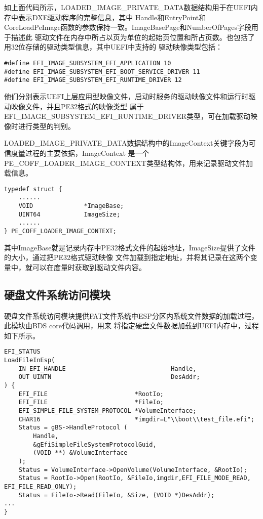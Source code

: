 如上面代码所示，LOADED\_IMAGE\_PRIVATE\_DATA数据结构用于在UEFI内存中表示DXE驱动程序的完整信息，其中
Handle和EntryPoint和CoreLoadPeImage函数的参数保持一致。ImageBasePage和NumberOfPages字段用于描述此
驱动文件在内存中所占以页为单位的起始页位置和所占页数。也包括了用32位存储的驱动类型信息，其中UEFI中支持的
驱动映像类型包括：

\begin{lstlisting}
#define EFI_IMAGE_SUBSYSTEM_EFI_APPLICATION 10
#define EFI_IMAGE_SUBSYSTEM_EFI_BOOT_SERVICE_DRIVER 11
#define EFI_IMAGE_SUBSYSTEM_EFI_RUNTIME_DRIVER 12
\end{lstlisting}

他们分别表示UEFI上层应用型映像文件，启动时服务的驱动映像文件和运行时驱动映像文件，并且PE32格式的映像类型
属于EFI\_IMAGE\_SUBSYSTEM\_EFI\_RUNTIME\_DRIVER类型，可在加载驱动映像时进行类型的判别。
\par LOADED\_IMAGE\_PRIVATE\_DATA数据结构中的ImageContext关键字段为可信度量过程的主要依据，ImageContext
是一个PE\_COFF\_LOADER\_IMAGE\_CONTEXT类型结构体，用来记录驱动文件加载信息。

\begin{lstlisting}
typedef struct {
    ......
    VOID              *ImageBase;
    UINT64            ImageSize;
    ......
} PE_COFF_LOADER_IMAGE_CONTEXT;
\end{lstlisting}

其中ImageBase就是记录内存中PE32格式文件的起始地址，ImageSize提供了文件的大小，通过把PE32格式驱动映像
文件加载到指定地址，并将其记录在这两个变量中，就可以在度量时获取到驱动文件内容。

\subsection{硬盘文件系统访问模块}
硬盘文件系统访问模块提供FAT文件系统中ESP分区内系统文件数据的加载过程，此模块由BDS core代码调用，用来
将指定硬盘文件数据加载到UEFI内存中，过程如下所示。

\begin{lstlisting}
EFI_STATUS
LoadFileInEsp(
    IN EFI_HANDLE                             Handle,
    OUT UINTN                                 DesAddr;
) {
    EFI_FILE                        *RootIo;
    EFI_FILE                        *FileIo;
    EFI_SIMPLE_FILE_SYSTEM_PROTOCOL *VolumeInterface;
    CHAR16                          *imgdir=L"\\boot\\test_file.efi";
    Status = gBS->HandleProtocol (
        Handle,
        &gEfiSimpleFileSystemProtocolGuid,
        (VOID **) &VolumeInterface
    );
    Status = VolumeInterface->OpenVolume(VolumeInterface, &RootIo);
    Status = RootIo->Open(RootIo, &FileIo,imgdir,EFI_FILE_MODE_READ, EFI_FILE_READ_ONLY);
    Status = FileIo->Read(FileIo, &Size, (VOID *)DesAddr);
...
}
\end{lstlisting}

